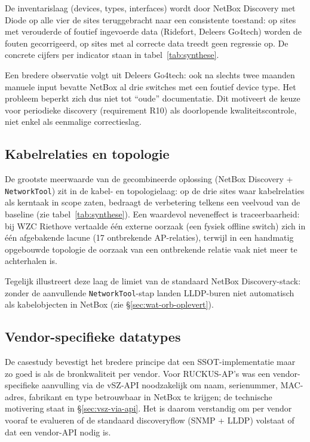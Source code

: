 De inventarislaag (devices, types, interfaces) wordt door NetBox Discovery met Diode op alle vier de sites teruggebracht naar een consistente toestand: op sites met verouderde of foutief ingevoerde data (Ridefort, Deleers Go4tech) worden de fouten gecorrigeerd, op sites met al correcte data treedt geen regressie op. De concrete cijfers per indicator staan in tabel~\ref{tab:synthese}.

Een bredere observatie volgt uit Deleers Go4tech: ook na slechts twee maanden manuele input bevatte NetBox al drie switches met een foutief device type. Het probleem beperkt zich dus niet tot ``oude'' documentatie. Dit motiveert de keuze voor periodieke discovery (requirement R10) als doorlopende kwaliteitscontrole, niet enkel als eenmalige correctieslag.

\subsection{Kabelrelaties en topologie}
\label{sec:analyse-kabels}

De grootste meerwaarde van de gecombineerde oplossing (NetBox Discovery + \texttt{NetworkTool}) zit in de kabel- en topologielaag: op de drie sites waar kabelrelaties als kerntaak in scope zaten, bedraagt de verbetering telkens een veelvoud van de baseline (zie tabel~\ref{tab:synthese}). Een waardevol neveneffect is traceerbaarheid: bij WZC Riethove vertaalde één externe oorzaak (een fysiek offline switch) zich in één afgebakende lacune (17 ontbrekende AP-relaties), terwijl in een handmatig opgebouwde topologie de oorzaak van een ontbrekende relatie vaak niet meer te achterhalen is.

Tegelijk illustreert deze laag de limiet van de standaard NetBox Discovery-stack: zonder de aanvullende \texttt{NetworkTool}-stap landen LLDP-buren niet automatisch als kabelobjecten in NetBox (zie \S\ref{sec:wat-orb-oplevert}).

\subsection{Vendor-specifieke datatypes}
\label{sec:analyse-vendor}

De casestudy bevestigt het bredere principe dat een SSOT-implementatie maar zo goed is als de bronkwaliteit per vendor. Voor RUCKUS-AP's was een vendor-specifieke aanvulling via de vSZ-API\autocite{RuckusVSZ} noodzakelijk om naam, serienummer, MAC-adres, fabrikant en type betrouwbaar in NetBox te krijgen; de technische motivering staat in \S\ref{sec:vsz-via-api}. Het is daarom verstandig om per vendor vooraf te evalueren of de standaard discoveryflow (SNMP + LLDP) volstaat of dat een vendor-API nodig is.


